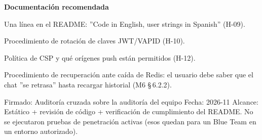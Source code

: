 \documentclass[10pt,a4paper]{article}
\begin{document}
\vspace{0.8em}\noindent\textbf{\large Documentación recomendada}\par\vspace{0.4em}
Una línea en el README: ''Code in English, user strings in Spanish'' (H-09).\par\vspace{0.4em}
Procedimiento de rotación de claves JWT/VAPID (H-10).\par\vspace{0.4em}
Política de CSP y qué orígenes push están permitidos (H-12).\par\vspace{0.4em}
Procedimiento de recuperación ante caída de Redis: el usuario debe saber que el chat ''se retrasa'' hasta recargar historial (M6 \S\,6.2.2).\par\vspace{0.4em}
Firmado: Auditoría cruzada sobre la auditoría del equipo  Fecha: 2026-11  Alcance: Estático + revisión de código + verificación de cumplimiento del README. No se ejecutaron pruebas de penetración activas (esos quedan para un Blue Team en un entorno autorizado).\par\vspace{0.4em}
\end{document}

